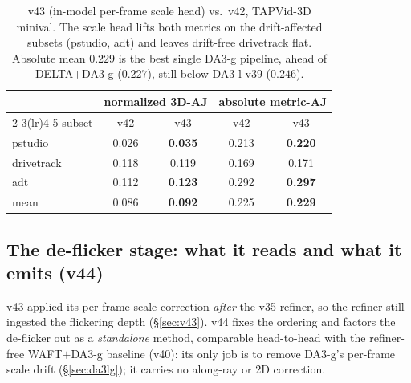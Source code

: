 \documentclass[11pt,a4paper]{article}
\begin{document}
\begin{table}[h]
\centering
\caption{v43 (in-model per-frame scale head) vs.\ v42, TAPVid-3D minival. The scale head lifts both metrics
on the drift-affected subsets (pstudio, adt) and leaves drift-free drivetrack flat. Absolute mean $0.229$ is
the best single DA3-g pipeline, ahead of DELTA$+$DA3-g ($0.227$), still below DA3-l v39 ($0.246$).}
\label{tab:v43}
\begin{tabular}{lcccc}
\toprule
 & \multicolumn{2}{c}{normalized 3D-AJ} & \multicolumn{2}{c}{absolute metric-AJ} \\
\cmidrule(lr){2-3}\cmidrule(lr){4-5}
subset & v42 & v43 & v42 & v43 \\
\midrule
pstudio    & 0.026 & \textbf{0.035} & 0.213 & \textbf{0.220} \\
drivetrack & 0.118 & 0.119 & 0.169 & 0.171 \\
adt        & 0.112 & \textbf{0.123} & 0.292 & \textbf{0.297} \\
\midrule
mean       & 0.086 & \textbf{0.092} & 0.225 & \textbf{0.229} \\
\bottomrule
\end{tabular}
\end{table}

\subsection{The de-flicker stage: what it reads and what it emits (v44)}
\label{sec:v44}
v43 applied its per-frame scale correction \emph{after} the v35 refiner, so the refiner still ingested the
flickering depth (\S\ref{sec:v43}). v44 fixes the ordering and factors the de-flicker out as a
\emph{standalone} method, comparable head-to-head with the refiner-free WAFT$+$DA3-g baseline (v40): its only
job is to remove DA3-g's per-frame scale drift (\S\ref{sec:da3lg}); it carries no along-ray or 2D correction.
\end{document}
